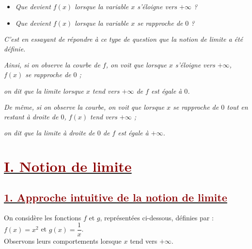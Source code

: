 \documentclass[12pt,a4paper]{article}
\begin{document}
\begin{tcolorbox}[
    colback=white,
    colframe=red,
    boxrule=0.5pt,
    sharp corners,
    left=8pt,
    right=8pt,
    top=8pt,
    bottom=8pt
]
\begin{itemize}
    \item \textit{Que devient \(f(x)\) lorsque la variable \(x\) s'éloigne vers \(+\infty\) ?}
    
    \item \textit{Que devient \(f(x)\) lorsque la variable \(x\) se rapproche de \(0\) ?}
\end{itemize}

\textit{
C'est en essayant de répondre à ce type de question que la notion de limite a été définie.
}

\medskip

\textit{
Ainsi, si on observe la courbe de \(f\), on voit que lorsque \(x\) s'éloigne vers \(+\infty\), \(f(x)\)
se rapproche de \(0\) ;
}

\textit{
on dit que la limite lorsque \(x\) tend vers \(+\infty\) de \(f\) est égale à \(0\).
}

\textit{
De même, si on observe la courbe, on voit que lorsque \(x\) se rapproche de \(0\) tout en restant
à droite de \(0\), \(f(x)\) tend vers \(+\infty\) ;
}

\textit{
on dit que la limite à droite de \(0\) de \(f\) est égale à \(+\infty\).
}

\end{tcolorbox}

\section*{\underline{\textcolor{darkred}{ I. Notion de limite}}}
\subsection*{\underline{\textcolor{darkred}{ 1. Approche intuitive de la notion de limite}}}

\noindent On considère les fonctions $f$ et $g$, représentées ci-dessous, définies par : $f(x) = x^2$ et $g(x) = \dfrac{1}{x}$. \\
Observons leurs comportements lorsque $x$ tend vers $+\infty$.

\vspace{0.8cm}
\end{document}
